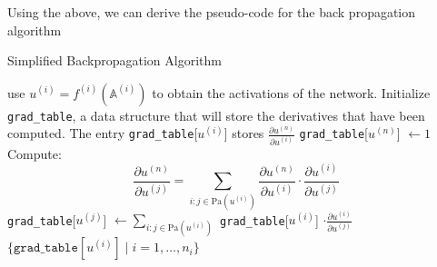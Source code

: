 \documentclass[a4paper,12pt]{article}
\begin{document}
Using the above, we can derive the pseudo-code for the back propagation algorithm
\begin{algorithm}[H]
\caption{Simplified Backpropagation Algorithm }\label{alg:simple-backprop}
\begin{algorithmic}[1]
\State use   $u^{(i)} = f^{(i)}(\mathbb{A}^{(i)})$ to obtain the activations of the network.
\State Initialize \texttt{grad\_table}, a data structure that will store the derivatives that have been computed.
\Statex \hspace{1.5em} The entry \texttt{grad\_table}[$u^{(i)}$] stores \( \frac{\partial u^{(n)}}{\partial u^{(i)}} \)
\State \texttt{grad\_table}[$u^{(n)}$] $\gets 1$
  \Statex \hspace{1.5em} Compute:
  \[
    \frac{\partial u^{(n)}}{\partial u^{(j)}} = \sum_{i : j \in \mathrm{Pa}(u^{(i)})} \frac{\partial u^{(n)}}{\partial u^{(i)}} \cdot \frac{\partial u^{(i)}}{\partial u^{(j)}}
  \]
  \State \texttt{grad\_table}[$u^{(j)}$] $\gets \sum_{i : j \in \mathrm{Pa}(u^{(i)})}$ \texttt{grad\_table}[$u^{(i)}$] $\cdot \frac{\partial u^{(i)}}{\partial u^{(j)}}$
\EndFor
\State \Return $\{\texttt{grad\_table}[u^{(i)}] \mid i = 1, \dots, n_i\}$
\end{algorithmic}
\end{algorithm}
\end{document}
